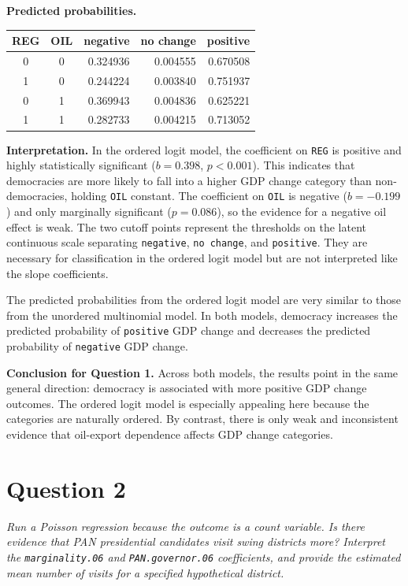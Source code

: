 \documentclass[12pt,letterpaper]{article}
\begin{document}
\noindent\textbf{Predicted probabilities.}

\begin{center}
\begin{tabular}{ccrrr}
\toprule
REG & OIL & negative & no change & positive \\
\midrule
0 & 0 & 0.324936 & 0.004555 & 0.670508 \\
1 & 0 & 0.244224 & 0.003840 & 0.751937 \\
0 & 1 & 0.369943 & 0.004836 & 0.625221 \\
1 & 1 & 0.282733 & 0.004215 & 0.713052 \\
\bottomrule
\end{tabular}
\end{center}

\noindent\textbf{Interpretation.} In the ordered logit model, the coefficient on \texttt{REG} is positive and highly statistically significant ($b = 0.398$, $p < 0.001$). This indicates that democracies are more likely to fall into a higher GDP change category than non-democracies, holding \texttt{OIL} constant. The coefficient on \texttt{OIL} is negative ($b = -0.199$) and only marginally significant ($p = 0.086$), so the evidence for a negative oil effect is weak. The two cutoff points represent the thresholds on the latent continuous scale separating \texttt{negative}, \texttt{no change}, and \texttt{positive}. They are necessary for classification in the ordered logit model but are not interpreted like the slope coefficients.

The predicted probabilities from the ordered logit model are very similar to those from the unordered multinomial model. In both models, democracy increases the predicted probability of \texttt{positive} GDP change and decreases the predicted probability of \texttt{negative} GDP change.

\noindent\textbf{Conclusion for Question 1.} Across both models, the results point in the same general direction: democracy is associated with more positive GDP change outcomes. The ordered logit model is especially appealing here because the categories are naturally ordered. By contrast, there is only weak and inconsistent evidence that oil-export dependence affects GDP change categories.

\section*{Question 2}
\noindent\emph{Run a Poisson regression because the outcome is a count variable. Is there evidence that PAN presidential candidates visit swing districts more? Interpret the \texttt{marginality.06} and \texttt{PAN.governor.06} coefficients, and provide the estimated mean number of visits for a specified hypothetical district.}
\end{document}
